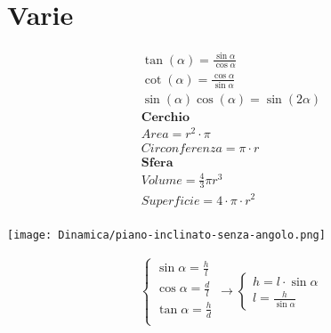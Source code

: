 \section{Varie}

\begin{gather*}
    \tan (\alpha) = \frac{\sin \alpha}{\cos \alpha} \\
    \cot (\alpha) = \frac{\cos \alpha}{\sin \alpha} \\
    \sin (\alpha) \cos (\alpha) = \sin (2 \alpha) \\
    \textbf{Cerchio} \\
    Area = r^2 \cdot \pi \\
    Circonferenza = \pi \cdot r \\
    \textbf{Sfera} \\
    Volume = \frac{4}{3} \pi r^3 \\
    Superficie = 4 \cdot \pi \cdot r^2 \\
\end{gather*}

\begin{center}
    \texttt{[image: Dinamica/piano-inclinato-senza-angolo.png]} \\
\end{center}

\begin{gather*}
    \begin{cases}
        \sin \alpha = \frac{h}{l} \\
        \cos \alpha = \frac{d}{l} \\
        \tan \alpha = \frac{h}{d} \\
    \end{cases} \rightarrow
    \begin{cases}
        h = l \cdot \sin \alpha \\
        l = \frac{h}{\sin \alpha}
    \end{cases} \\
\end{gather*}
